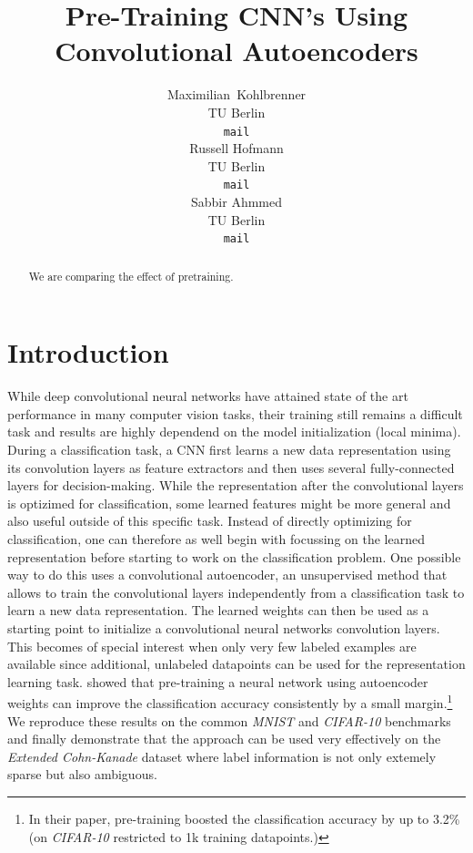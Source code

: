 \documentclass[draft]{article}
\title{Pre-Training CNN's Using Convolutional Autoencoders}
\author{
  Maximilian~Kohlbrenner\\
  TU Berlin\\
  \texttt{mail} \\
  \And
  Russell Hofmann\\
  TU Berlin\\
  \texttt{mail} \\
  \AND
  Sabbir Ahmmed \\
  TU Berlin \\
  \texttt{mail}
}
\begin{document}

\maketitle

\begin{abstract}
  We are comparing the effect of pretraining.
\end{abstract}


\section{Introduction}
  While deep convolutional neural networks have attained state of the art performance in many computer vision tasks, their training still remains a difficult task and results are highly dependend on the model initialization (local minima). 
  During a classification task, a CNN first learns a new data representation using its convolution layers as feature extractors and then uses several fully-connected layers for decision-making. 
  While the representation after the convolutional layers is optizimed for classification, some learned features might be more general and also useful outside of this specific task. 
  Instead of directly optimizing for classification, one can therefore as well begin with focussing on the learned representation before starting to work on the classification problem.
  One possible way to do this uses a convolutional autoencoder, an unsupervised method that allows to train the convolutional layers independently from a classification task to learn a new data representation. 
  The learned weights can then be used as a starting point to initialize a convolutional neural networks convolution layers. 
  This becomes of special interest when only very few labeled examples are available since additional, unlabeled datapoints can be used for the representation learning task. 
  \citep{masci11} showed that pre-training a neural network using autoencoder weights can improve the classification accuracy consistently by a small margin.\footnote{In their paper, pre-training boosted the classification accuracy by up to 3.2\% (on \emph{CIFAR-10} restricted to 1k training datapoints.)}
  We reproduce these results on the common \emph{MNIST} \citep{lecun1998mnist} and \emph{CIFAR-10} \citep{krizhevsky2009learning} benchmarks and finally demonstrate that the approach can be used very effectively on the \emph{Extended Cohn-Kanade} \citep{kanade2000comprehensive,lucey2010extended} dataset where label information is not only extemely sparse but also ambiguous. 
\end{document}
